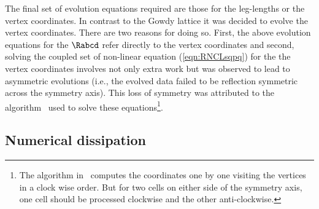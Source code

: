 \documentclass[a4paper,12pt]{article}
\numberwithin{equation}{section}
\begin{document}
The final set of evolution equations required are those for the leg-lengths or the vertex
coordinates. In contrast to the Gowdy lattice it was decided to evolve the vertex
coordinates. There are two reasons for doing so. First, the above evolution equations for
the $\Rabcd$ refer directly to the vertex coordinates and second, solving the coupled set of
non-linear equation (\ref{eqn:RNCLsqpq}) for the the vertex coordinates involves not only
extra work but was observed to lead to asymmetric evolutions (i.e., the evolved data failed
to be reflection symmetric across the symmetry axis). This loss of symmetry was attributed
to the algorithm~\cite{brewin:2014-01} used to solve these equations\footnote{The algorithm
in~\cite{brewin:2014-01} computes the coordinates one by one visiting the vertices in a
clock wise order. But for two cells on either side of the symmetry axis, one cell should be
processed clockwise and the other anti-clockwise.}.

\subsection{Numerical dissipation}
\label{sec:BrillKreissOliger}
\end{document}
